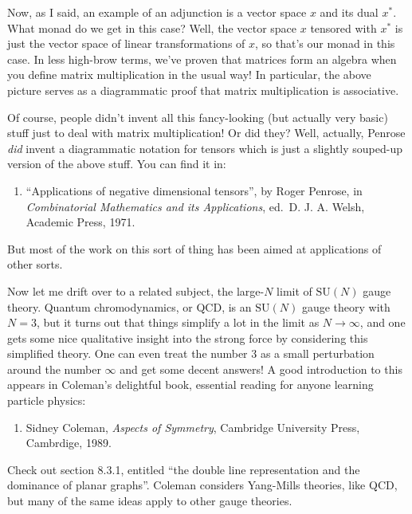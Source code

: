 \documentclass{article}
\def\tightlist{}
\begin{document}
Now, as I said, an example of an adjunction is a vector space \(x\) and
its dual \(x^*\). What monad do we get in this case? Well, the vector
space \(x\) tensored with \(x^*\) is just the vector space of linear
transformations of \(x\), so that's our monad in this case. In less
high-brow terms, we've proven that matrices form an algebra when you
define matrix multiplication in the usual way! In particular, the above
picture serves as a diagrammatic proof that matrix multiplication is
associative.

Of course, people didn't invent all this fancy-looking (but actually
very basic) stuff just to deal with matrix multiplication! Or did they?
Well, actually, Penrose \emph{did} invent a diagrammatic notation for
tensors which is just a slightly souped-up version of the above stuff.
You can find it in:

\begin{enumerate}
\def\labelenumi{\arabic{enumi})}
\tightlist
\item
  ``Applications of negative dimensional tensors'', by Roger Penrose, in
  \emph{Combinatorial Mathematics and its Applications}, ed.~D. J. A.
  Welsh, Academic Press, 1971.
\end{enumerate}

But most of the work on this sort of thing has been aimed at
applications of other sorts.

Now let me drift over to a related subject, the large-\(N\) limit of
\(\mathrm{SU}(N)\) gauge theory. Quantum chromodynamics, or QCD, is an
\(\mathrm{SU}(N)\) gauge theory with \(N = 3\), but it turns out that
things simplify a lot in the limit as \(N\to\infty\), and one gets some
nice qualitative insight into the strong force by considering this
simplified theory. One can even treat the number \(3\) as a small
perturbation around the number \(\infty\) and get some decent answers! A
good introduction to this appears in Coleman's delightful book,
essential reading for anyone learning particle physics:

\begin{enumerate}
\def\labelenumi{\arabic{enumi})}
\setcounter{enumi}{1}
\tightlist
\item
  Sidney Coleman, \emph{Aspects of Symmetry}, Cambridge University
  Press, Cambrdige, 1989.
\end{enumerate}

Check out section 8.3.1, entitled ``the double line representation and
the dominance of planar graphs''. Coleman considers Yang-Mills theories,
like QCD, but many of the same ideas apply to other gauge theories.
\end{document}
